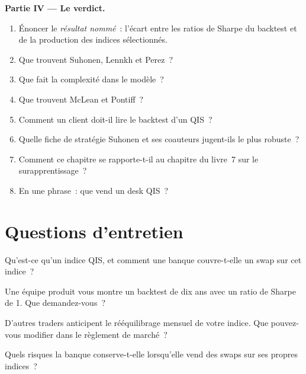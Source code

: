 \begin{problem}
\medskip\noindent\textbf{Partie IV --- Le verdict.}
\begin{enumerate}[resume]
\item Énoncer le \emph{résultat nommé}~: l'écart entre les ratios de Sharpe du backtest et de la production des indices sélectionnés.
\item Que trouvent Suhonen, Lennkh et Perez~?
\item Que fait la complexité dans le modèle~?
\item Que trouvent McLean et Pontiff~?
\item Comment un client doit-il lire le backtest d'un QIS~?
\item Quelle fiche de stratégie Suhonen et ses coauteurs jugent-ils le plus robuste~?
\item Comment ce chapitre se rapporte-t-il au chapitre du livre~7 sur le surapprentissage~?
\item En une phrase~: que vend un desk QIS~?
\end{enumerate}
\end{problem}

\section{Questions d'entretien}

\begin{interviewq}\label{iq:s2:quantitative-investment-strategies:1}
Qu'est-ce qu'un indice QIS, et comment une banque couvre-t-elle un swap sur cet indice~?
\end{interviewq}

\begin{interviewq}\label{iq:s2:quantitative-investment-strategies:2}
Une équipe produit vous montre un backtest de dix ans avec un ratio de Sharpe de 1. Que demandez-vous~?
\end{interviewq}

\begin{interviewq}\label{iq:s2:quantitative-investment-strategies:3}
D'autres traders anticipent le rééquilibrage mensuel de votre indice. Que pouvez-vous modifier dans le règlement de marché~?
\end{interviewq}

\begin{interviewq}\label{iq:s2:quantitative-investment-strategies:4}
Quels risques la banque conserve-t-elle lorsqu'elle vend des swaps sur ses propres indices~?
\end{interviewq}

